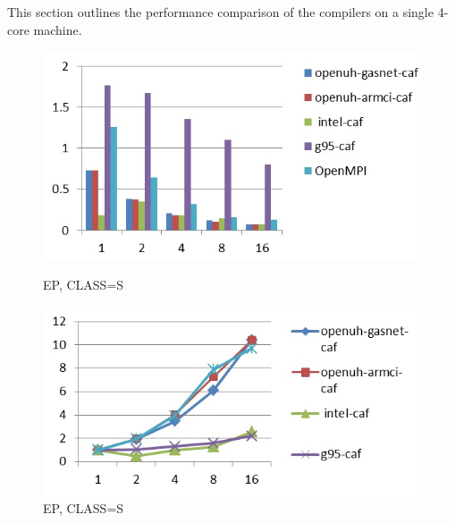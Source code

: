 This section outlines the performance comparison of the
compilers on a single 4-core machine.


\begin{figure}[ht]
\begin{minipage}[b]{0.45\linewidth}
\centering
\includegraphics[width=\textwidth]{./figures/ep_S_time.jpg}
\caption{EP, CLASS=S}
\label{fig:figure1}
\end{minipage}
\hspace{0.5cm}
\begin{minipage}[b]{0.45\linewidth}
\centering
\includegraphics[width=\textwidth]{./figures/ep_S_scalability.jpg}
\caption{EP, CLASS=S}
\label{fig:figure2}
\end{minipage}
\end{figure}


